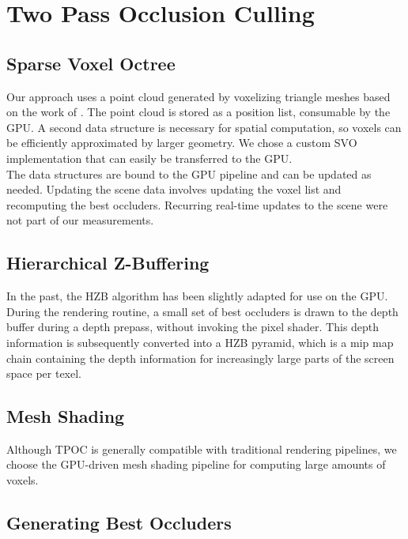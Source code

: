 \documentclass[conference]{IEEEtran}
\begin{document}
\section{Two Pass Occlusion Culling} \label{sec-hierarchical-z-buffering}

\subsection{Sparse Voxel Octree}

\noindent
Our approach uses a point cloud generated by voxelizing triangle meshes based on the work of \cite{b5}. 
The point cloud is stored as a position list, consumable by the \ac{GPU}. A second data structure is 
necessary for spatial computation, so voxels can be efficiently approximated by larger geometry. 
We chose a custom \ac{SVO} implementation that can easily be transferred to the \ac{GPU}. \\

\noindent
The data structures are bound to the \ac{GPU} pipeline and can be updated as needed. Updating the scene data 
involves updating the voxel list and recomputing the best occluders. Recurring real-time updates to the 
scene were not part of our measurements.

\subsection{Hierarchical Z-Buffering}

\noindent
In the past, the \ac{HZB} algorithm has been slightly adapted for use on the \ac{GPU}. During the rendering 
routine, a small set of best occluders is drawn to the depth buffer during a depth prepass, without invoking 
the pixel shader. This depth information is subsequently converted into a \ac{HZB} pyramid, which is a mip 
map chain containing the depth information for increasingly large parts of the screen space per texel. \\

\subsection{Mesh Shading}

\noindent
Although \ac{TPOC} is generally compatible with traditional rendering pipelines, we choose the 
\ac{GPU}-driven mesh shading pipeline for computing large amounts of voxels. 


\subsection{Generating Best Occluders} \label{sec-gen-best-occluders}
\end{document}
